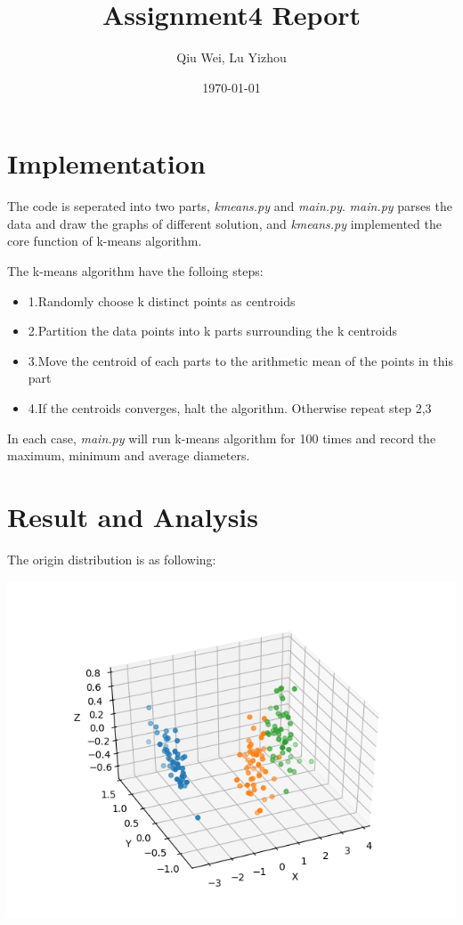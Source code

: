 \documentclass[11pt]{article}
\author{Qiu Wei, Lu Yizhou}
\date{\today}
\title{Assignment4 Report}
\begin{document}
\maketitle
\tableofcontents


\section{Implementation}
\label{sec-1}
The code is seperated into two parts, \emph{kmeans.py} and \emph{main.py}.
\emph{main.py} parses the data and draw the graphs of different solution,
and \emph{kmeans.py} implemented the core function of k-means algorithm.

The k-means algorithm have the folloing steps:

\begin{itemize}
\item 1.Randomly choose k distinct points as centroids
\item 2.Partition the data points into k parts surrounding the k centroids
\item 3.Move the centroid of each parts to the arithmetic mean of the points in this part
\item 4.If the centroids converges, halt the algorithm. Otherwise repeat step 2,3
\end{itemize}

In each case, \emph{main.py} will run k-means algorithm for 100 times and record the
maximum, minimum and average diameters.
\section{Result and Analysis}
\label{sec-2}
The origin distribution is as following:

\includegraphics[width=.9\linewidth]{raw_data.png}
\end{document}
